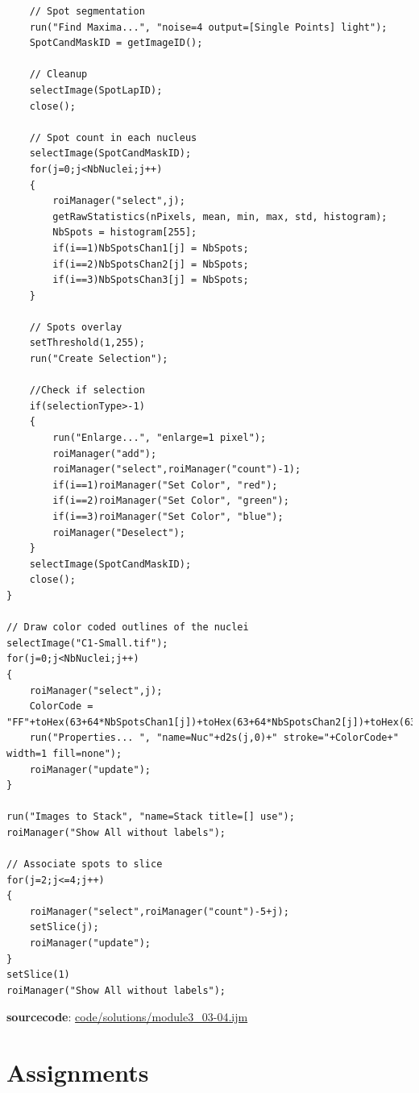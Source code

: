 \documentclass[11pt,a4paper,oneside]{report}
\begin{document}
\begin{itemize}
\begin{lstlisting}
	// Spot segmentation
	run("Find Maxima...", "noise=4 output=[Single Points] light");
	SpotCandMaskID = getImageID();
	
	// Cleanup
	selectImage(SpotLapID);	
	close();

	// Spot count in each nucleus
	selectImage(SpotCandMaskID);
	for(j=0;j<NbNuclei;j++)
	{
		roiManager("select",j);
		getRawStatistics(nPixels, mean, min, max, std, histogram);
		NbSpots = histogram[255];
		if(i==1)NbSpotsChan1[j] = NbSpots;
		if(i==2)NbSpotsChan2[j] = NbSpots;
		if(i==3)NbSpotsChan3[j] = NbSpots;
	}
		
	// Spots overlay
	setThreshold(1,255);
	run("Create Selection");
	
	//Check if selection
	if(selectionType>-1)
	{
		run("Enlarge...", "enlarge=1 pixel");
		roiManager("add");
		roiManager("select",roiManager("count")-1);
		if(i==1)roiManager("Set Color", "red");
		if(i==2)roiManager("Set Color", "green");
		if(i==3)roiManager("Set Color", "blue");
		roiManager("Deselect");
	}
	selectImage(SpotCandMaskID);
	close();
}
	
// Draw color coded outlines of the nuclei
selectImage("C1-Small.tif");
for(j=0;j<NbNuclei;j++)
{
	roiManager("select",j);
	ColorCode = "FF"+toHex(63+64*NbSpotsChan1[j])+toHex(63+64*NbSpotsChan2[j])+toHex(63+64*NbSpotsChan3[j]);
	run("Properties... ", "name=Nuc"+d2s(j,0)+" stroke="+ColorCode+" width=1 fill=none");
	roiManager("update");
}

run("Images to Stack", "name=Stack title=[] use");
roiManager("Show All without labels");

// Associate spots to slice
for(j=2;j<=4;j++)
{
	roiManager("select",roiManager("count")-5+j);
	setSlice(j);
	roiManager("update");
}
setSlice(1)
roiManager("Show All without labels");
\end{lstlisting}
\textbf{sourcecode}: \href{http://www.example.com/contents}{code/solutions/module3\_03-04.ijm}
\end{itemize}


\section{Assignments}
\end{document}
